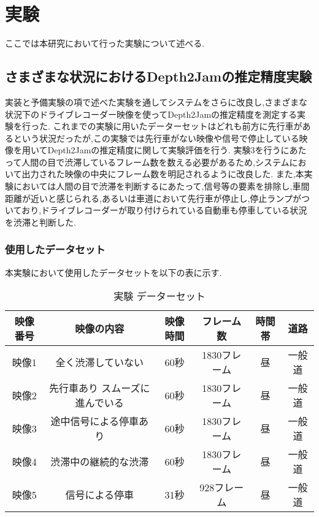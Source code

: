 \chapter{実験}
ここでは本研究において行った実験について述べる.

\section{さまざまな状況におけるDepth2Jamの推定精度実験}
\label{sec:exp1}
実装と予備実験の項で述べた実験を通してシステムをさらに改良し,さまざまな状況下のドライブレコーダー映像を使ってDepth2Jamの推定精度を測定する実験を行った.
これまでの実験に用いたデーターセットはどれも前方に先行車があるという状況だったが,この実験では先行車がない映像や信号で停止している映像を用いてDepth2Jamの推定精度に関して実験評価を行う.
実験3を行うにあたって人間の目で渋滞しているフレーム数を数える必要があるため,システムにおいて出力された映像の中央にフレーム数を明記されるように改良した.
また,本実験においては人間の目で渋滞を判断するにあたって,信号等の要素を排除し,車間距離が近いと感じられる,あるいは車道において先行車が停止し,停止ランプがついており,ドライブレコーダーが取り付けられている自動車も停車している状況を渋滞と判断した.
%
%
%

\subsection{使用したデータセット}
本実験において使用したデータセットを以下の表に示す.

\begin{table}[htbp]
  \centering
  \begin{scriptsize}
  \begin{tabular}{cccccc}
  \toprule
映像番号 & 映像の内容 & 映像時間 & フレーム数 & 時間帯 & 道路 \\
  \midrule
映像1 & 全く渋滞していない & 60秒 & 1830フレーム & 昼 & 一般道 \\
映像2 & 先行車あり スムーズに進んでいる & 60秒 & 1830フレーム & 昼 & 一般道 \\
映像3 & 途中信号による停車あり & 60秒 & 1830フレーム & 昼 & 一般道 \\
映像4 & 渋滞中の継続的な渋滞 & 60秒 & 1830フレーム & 昼 & 一般道 \\
映像5 & 信号による停車 & 31秒& 928フレーム & 昼 & 一般道 \\
  \bottomrule
  \end{tabular}
  \end{scriptsize}
  \caption{実験 データーセット}
  \label{tab:exp_dataset3}
\end{table}


